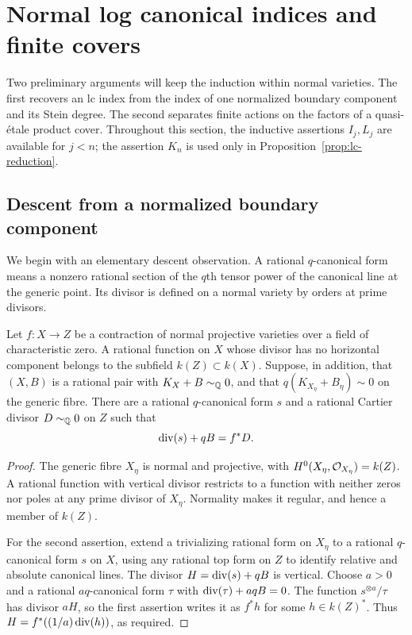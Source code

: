 \section{Normal log canonical indices and finite covers}\label{sec:index}

Two preliminary arguments will keep the induction within normal varieties.
The first recovers an lc index from the index of one normalized boundary
component and its Stein degree. The second separates finite actions on
the factors of a quasi-\'etale product cover. Throughout this section,
the inductive assertions $I_j,L_j$ are available for $j<n$; the assertion
$K_n$ is used only in Proposition~\ref{prop:lc-reduction}.

\subsection{Descent from a normalized boundary component}

We begin with an elementary descent observation. A rational
$q$-canonical form means a nonzero rational section of the $q$th tensor
power of the canonical line at the generic point. Its divisor is defined
on a normal variety by orders at prime divisors.

\begin{lemma}\label{lem:vertical-descent}
Let $f:X\to Z$ be a contraction of normal projective varieties over a
field of characteristic zero. A rational function on $X$ whose divisor
has no horizontal component belongs to the subfield $k(Z)\subset k(X)$.
Suppose, in addition, that $(X,B)$ is a rational pair with
$K_X+B\sim_{\mathbb Q}0$, and that $q(K_{X_\eta}+B_\eta)\sim0$ on the generic
fibre. There are a rational $q$-canonical form $s$ and a rational Cartier
divisor $D\sim_{\mathbb Q}0$ on $Z$ such that
\begin{equation}\label{eq:index-vertical-form}
                 \operatorname{div}(s)+qB=f^*D.
\end{equation}
\end{lemma}

\begin{proof}
The generic fibre $X_\eta$ is normal and projective, with
$H^0(X_\eta,\mathcal O_{X_\eta})=k(Z)$. A rational function with vertical
divisor restricts to a function with neither zeros nor poles at any
prime divisor of $X_\eta$. Normality makes it regular, and hence a
member of $k(Z)$.

For the second assertion, extend a trivializing rational form on
$X_\eta$ to a rational $q$-canonical form $s$ on $X$, using any rational
top form on $Z$ to identify relative and absolute canonical lines.
The divisor $H=\operatorname{div}(s)+qB$ is vertical. Choose $a>0$ and a rational
$aq$-canonical form $\tau$ with $\operatorname{div}(\tau)+aqB=0$. The function
$s^{\otimes a}/\tau$ has divisor $aH$, so the first assertion writes
it as $f^*h$ for some $h\in k(Z)^*$. Thus
$H=f^*((1/a)\operatorname{div}(h))$, as required.
\end{proof}


